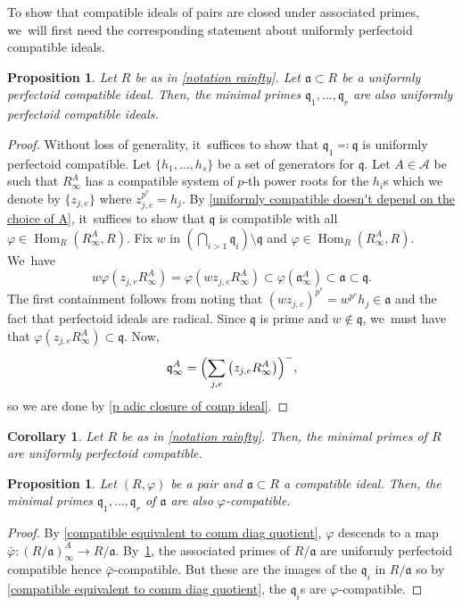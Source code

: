 \documentclass[JEP,XML,SOM,Unicode,published]{cedram}
\let\autoref\cref
\theoremstyle{plain}
\newtheorem{corollary}[theorem]{Corollary}
\newtheorem{proposition}[theorem]{Proposition}
\theoremstyle{definition}
\numberwithin{equation}{theorem}
\newcommand{\fra}{\mathfrak{a}}
\newcommand{\q}{\mathfrak{q}}
\DeclareMathOperator{\Hom}{Hom}
\newcommand{\sA}{\mathcal{A}}
\newcommand{\pe}{{p^e}}
\renewcommand{\phi}{\varphi}
\newcommand{\rphi}{(R,\phi)}
\newcommand{\rafty}{R^A_\infty}
\newcommand{\aafty}{\fra^A_\infty}
\begin{document}
To show that compatible ideals of pairs are closed under associated primes, we~will first need the corresponding statement about uniformly perfectoid compatible ideals.

\begin{proposition}\label{uniform compatible closed under ass primes}
Let $R$ be as in \autoref{notation rainfty}. Let $\fra\subset R$ be a uniformly perfectoid compatible ideal. Then, the minimal primes $\q_1,\ldots,\q_r$ are also uniformly perfectoid compatible ideals.
\end{proposition}

\begin{proof}
Without loss of generality, it~suffices to show that $\q_1\eqqcolon \q$ is uniformly perfectoid compatible. Let $\{h_1,\ldots,h_s\}$ be a set of generators for $\q$. Let $A\in \sA$ be such that $\rafty$ has a compatible system of $p$-th power roots for the $h_i$s which we denote by
$\{z_{j,e}\}$ where $z_{j,e}^\pe=h_j$.
By \autoref{uniformly compatible doesn't depend on the choice of A}, it~suffices to show that $\q$ is compatible with all $\phi\in \Hom_R(\rafty,R)$.
Fix $w$ in $(\bigcap_{i>1} \q_i)\setminus \q$ and $\phi\in \Hom_R(\rafty,R)$. We~have
\[
w\phi\left(z_{j,e} \rafty\right)=\phi\left(wz_{j,e} \rafty\right)\subset \phi\left(\aafty\right)\subset \fra \subset \q.
\]
The first containment follows from noting that $\left(wz_{j,e}\right)^\pe=w^{\pe}h_j \in \fra$ and the fact that perfectoid ideals are radical. Since $\q$ is prime and $w\notin \q$, we~must have that $\phi\left(z_{j,e}\rafty\right)\subset \q$. Now,\vspace*{-3pt}
\[
\q^A_\infty=\Bigl( \sum_{j,e} \left(z_{j,e}\rafty\right) \Bigr)^{-},
\]
so we are done by \autoref{p adic closure of comp ideal}.
\end{proof}

\begin{corollary}\label{ass primes of ring are uniformly compatible}
Let $R$ be as in \autoref{notation rainfty}. Then, the minimal primes of $R$ are uniformly perfectoid compatible.
\end{corollary}

\begin{proposition}\label{compatible ideals of pairs closed under ass primes}
Let $\rphi$ be a pair and $\fra\subset R$ a compatible ideal. Then, the minimal primes $\q_1,\ldots,\q_r$ of $\fra$ are also $\phi$-compatible.
\end{proposition}

\begin{proof}
By \autoref{compatible equivalent to comm diag quotient}, $\phi$ descends to a map $\bar{\phi}\colon (R/\fra)^A_\infty\to R/\fra$. By~\autoref{ass primes of ring are uniformly compatible}, the associated primes of $R/\fra$ are uniformly perfectoid compatible hence $\bar{\phi}$-compatible. But these are the images of the $\q_i$ in $R/\fra$ so by \autoref{compatible equivalent to comm diag quotient}, the $\q_i$s are $\phi$-compatible.
\end{proof}
\end{document}
